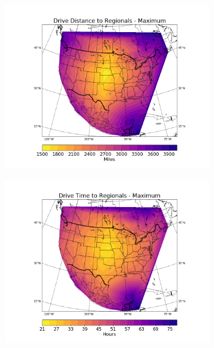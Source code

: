 \documentclass[11pt,twocolumn]{article}
\begin{document}
\begin{figure}
\begin{subfigure}{.5\textwidth}
  \includegraphics[height=.3\textheight]{../figs/Figure_5}
\end{subfigure}
\begin{subfigure}{.5\textwidth}
  \includegraphics[height=.3\textheight]{../figs/Figure_6}
\end{subfigure}
\begin{subfigure}{.5\textwidth}

\end{subfigure}
\end{figure}
\end{document}
